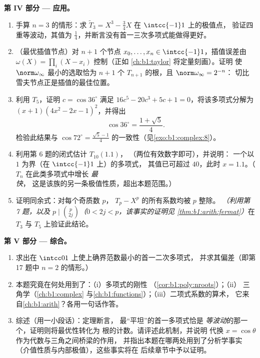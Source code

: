 \begin{problem}
\medskip
\noindent\textbf{第 IV 部分 --- 应用。}
\begin{enumerate}[resume]
  \item 手算 $n = 3$ 的情形：求
        $\widetilde T_3 = X^3 - \frac34X$ 在 $\intcc{-1}1$ 上的极值点，
        验证四重等波动，其值为
        $\frac14$，并断言没有首一三次多项式能做得更好。
  \item （最优插值节点）对 $n + 1$ 个节点 $x_0,
        \dots, x_n \in \intcc{-1}1$，插值误差由
        $\omega(X) = \prod_i (X - x_i)$ 控制（正如
        \cref{ch:b1:taylor} 将定量刻画）。证明
        使 $\norm\omega_\infty$ 最小的选取恰为 $n + 1$ 个
        $T_{n+1}$ 的根，且 $\norm\omega_\infty = 2^{-n}$：
        切比雪夫节点正是插值的最佳位置。
  \item 利用 $T_5$，证明 $c = \cos 36^\circ$ 满足
        $16c^5 - 20c^3 + 5c + 1 = 0$，将该多项式分解为
        $(x + 1)(4x^2 - 2x - 1)^2$，并得出
        \[
        \cos 36^\circ = \frac{1 + \sqrt5}4 .
        \]
        检验此结果与 $\cos 72^\circ =
        \frac{\sqrt5 - 1}4$ 的一致性（见\cref{exo:b1:complex:8}）。
  \item 利用第 6 题的闭式估计 $T_{10}(1.1)$，
        （两位有效数字即可），并说明：
        一个以 $1$ 为界（在 $\intcc{-1}1$ 上）的多项式，
        其值已可超过 $40$，此时 $x = 1.1$。（$T_n$ 在此类多项式中增长
        \emph{最快}，
        这是该族的另一条极值性质，超出本题范围。）
  \item 证明同余式：对每个奇质数 $p$，
        $T_p - X^p$ 的所有系数均被 $p$ 整除。
        \emph{（利用第 7 题，以及 $p \mid \binom p{2j}$（$0 <
        2j < p$，该事实的证明见
        \cref{thm:b1:arith:fermat}）}在 $T_3$ 与 $T_5$ 上验证此结论。
\end{enumerate}

\medskip
\noindent\textbf{第 V 部分 --- 综合。}
\begin{enumerate}[resume]
  \item 求出在 $\intcc01$ 上使上确界范数最小的首一二次多项式，
        并求其偏差（即第 17 题中
        $n = 2$ 的情形。）
  \item 本题究竟在何处用到了：（i）多项式的刚性
        （\cref{cor:b1:poly:nroots}）；（ii）
        三角学（\cref{ch:b1:complex}
        与\cref{ch:b1:functions}）；（iii）二项式系数的算术，
        它来自\cref{ch:b1:arith}？各用一句话作答。
  \item 综述（用一小段话）：定理断言，
        最“平坦”的首一多项式恰是
        \emph{等波动}的那一个，证明则将最优性转化为
        根的计数。请评述此机制，并说明
        代换 $x = \cos\theta$ 作为代数与三角之间桥梁的作用，
        并指出本题在哪两处用到了分析学事实
        （介值性质与内部极值），这些事实将在
        后续章节中予以证明。
\end{enumerate}
\end{problem}
